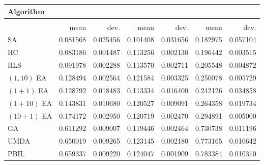 \begin{tabular}{@{} l *{6}{>{{}}N{1}{2}} @{}}
\toprule
{Algorithm} &  \\
\midrule
&  &  &  \\
\midrule
& {mean} & {dev.} & {mean} & {dev.} & {mean} & {dev.} \\
\midrule
SA & 0.081568 & 0.025456 & 0.101408 & 0.031656 & 0.182975 & 0.057104 \\
HC & 0.083186 & 0.001487 & 0.113256 & 0.002130 & 0.196442 & 0.003515 \\
RLS & 0.091978 & 0.002288 & 0.113570 & 0.002711 & 0.205548 & 0.004872 \\
$(1,10)$ EA & 0.128494 & 0.002564 & 0.121584 & 0.003325 & 0.250078 & 0.005729 \\
$(1+1)$ EA & 0.128792 & 0.018483 & 0.113334 & 0.016400 & 0.242126 & 0.034858 \\
$(1+10)$ EA & 0.143831 & 0.010680 & 0.120527 & 0.009091 & 0.264358 & 0.019734 \\
$(10+1)$ EA & 0.174172 & 0.002950 & 0.120719 & 0.002470 & 0.294891 & 0.005000 \\
GA & 0.611292 & 0.009007 & 0.119446 & 0.002464 & 0.730738 & 0.011196 \\
UMDA & 0.650019 & 0.009265 & 0.123145 & 0.002180 & 0.773165 & 0.010642 \\
PBIL & 0.659337 & 0.009220 & 0.124047 & 0.001909 & 0.783384 & 0.010310 \\
\bottomrule
\end{tabular}

